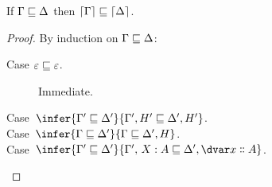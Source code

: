 
\nextlemma
\begin{lemma}\label{lemma-weakening-strip-context}
  If $\Gamma \sqsubseteq \Delta$ then $\lceil{\Gamma}\rceil \sqsubseteq \lceil{\Delta}\rceil$.
\end{lemma}
\begin{proof}
  By induction on $\Gamma \sqsubseteq \Delta$:

  \begin{description}
    \item[Case $\varepsilon \sqsubseteq \varepsilon$.] Immediate.

  \item[Case\, $\infer{\Gamma' \weaker \Delta'}{\Gamma',H' \weaker
      \Delta',H'}$.] \XXX

  \item[Case\, $\infer{\Gamma \weaker \Delta'}{\Gamma \weaker \Delta',H}$.] \XXX

  \item[Case\, $\infer{\Gamma' \weaker \Delta'}{\Gamma',\,\hm x A \weaker
      \Delta',\hd x A}$.] \XXX 
  \end{description}
\end{proof}


\nextlemma
\Weakening*

